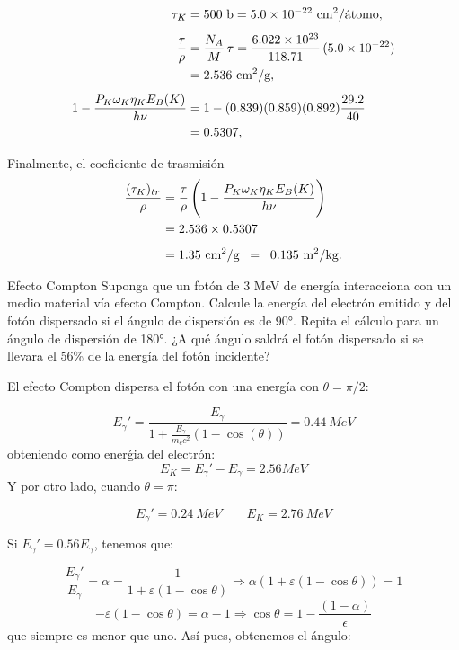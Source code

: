 \begin{align} \small
    \tau_K &= 500\ \text{b} = 5.0\times 10^{-22}\ \text{cm}^2/\text{átomo}, \\[1ex]
    \frac{\tau}{\rho} &= \frac{N_A}{M}\,\tau 
    = \frac{6.022\times 10^{23}}{118.71}\,(5.0\times 10^{-22}) \notag \\
    &= 2.536\ \text{cm}^2/\text{g}, \\[1ex]
    1 - \frac{P_K \omega_K \eta_K E_B(K)}{h\nu} 
    &= 1 - (0.839)(0.859)(0.892)\frac{29.2}{40} \notag \\
    &= 0.5307, \\[1ex]
\end{align}
Finalmente, el coeficiente de trasmisión 
\begin{align}
    \frac{(\tau_K)_{tr}}{\rho} 
    &= \frac{\tau}{\rho}\,\Biggl(1 - \frac{P_K \omega_K \eta_K E_B(K)}{h\nu}\Biggr) \notag \\
    &= 2.536 \times 0.5307 \\[1ex]
    &= 1.35\ \text{cm}^2/\text{g} \;\;=\;\; 0.135\ \text{m}^2/\text{kg}.
\end{align}



\begin{Ejercicio}{Efecto Compton}
    Suponga que un fotón de 3 MeV de energía interacciona con un medio material vía efecto Compton. Calcule la energía del electrón emitido y del fotón dispersado si el ángulo de dispersión es de 90°. Repita el cálculo para un ángulo de dispersión de 180°. ¿A qué ángulo saldrá el fotón dispersado si se llevara el 56\% de la energía del fotón incidente?
\end{Ejercicio}

El efecto Compton dispersa el fotón con una energía con $\theta=\pi/2$:

\begin{equation*}
    E_{\gamma}' = \frac{E_{\gamma}}{1+\frac{E_{\gamma}}{m_ec^2} (1-\cos(\theta))} = 0.44 \ \unit{MeV}
\end{equation*}
obteniendo como enerǵia del electrón: 
\begin{equation*}
    E_K = E_{\gamma}'-E_{\gamma} =  2.56 \unit{MeV}
\end{equation*}
Y por otro lado, cuando $\theta=\pi$:

$$ E_{\gamma}'  = 0.24 \ \unit{MeV} \qquad 
E_K = 2.76 \ \unit{MeV}$$

Si $E_{\gamma}'=0.56 E_{\gamma}$, tenemos que: 

\begin{equation*}
    \frac{E_{\gamma}'}{E_{\gamma}} = \alpha = \frac{1}{1+\varepsilon (1-\cos \theta)} \Rightarrow \alpha (1+\varepsilon (1-\cos \theta)) = 1 
\end{equation*}
\begin{equation*}
    -\varepsilon (1-\cos \theta) = \alpha-1 \Rightarrow \cos \theta =  1 -  \frac{(1-\alpha)}{\epsilon}
\end{equation*}
que siempre es menor que uno. Así pues, obtenemos el ángulo: 

